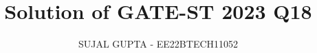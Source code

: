 \documentclass[journal,12pt,twocolumn]{IEEEtran}
\theoremstyle{remark}
\begin{document}
%




\vspace{3cm}

\title{
Solution of GATE-ST 2023 Q18
}
\author{ SUJAL GUPTA - EE22BTECH11052
}	


%
%
%

% 
%



% 
\end{document}
